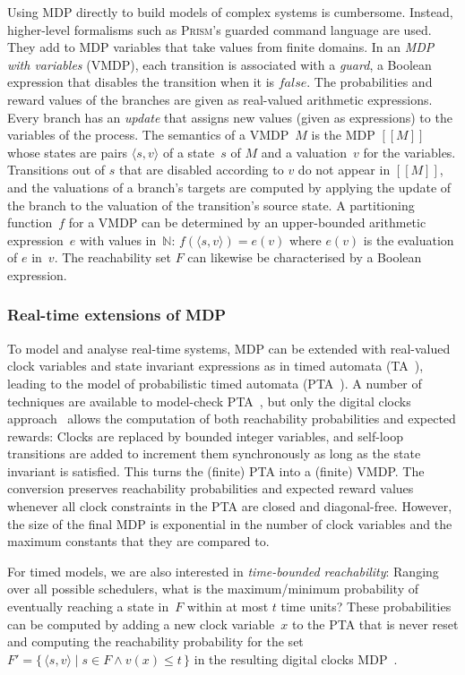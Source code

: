 \documentclass{llncs}
\newcommand{\prism}{\textsc{Prism}\xspace}
\newcommand{\set}[1]{\ensuremath{\{\,#1\,\}}}
\newcommand{\tuple}[1]{\ensuremath{\langle #1 \rangle}}
\newcommand{\NN}{\ensuremath{\mathbb{N}}\xspace}
\newcommand{\False}[0]{\ensuremath{\mathit{false}}\xspace}
\newcommand{\sem}[1]{\ensuremath{[\![ #1 ]\!]}}
\begin{document}
Using MDP directly to build models of complex systems is cumbersome.
Instead, higher-level formalisms such as \prism's guarded command language are used.
They add  to MDP variables that take values from finite domains.
In an \emph{MDP with variables} (VMDP),
each transition is associated with a \emph{guard}, a Boolean expression that disables the transition when it is \False.
The probabilities and reward values of the branches are given as real-valued arithmetic expressions.
Every branch has an \emph{update} that assigns new values (given as expressions) to the variables of the process.
The semantics of a VMDP~$M$ is the MDP $\sem{M}$ whose states are pairs $\tuple{s, v}$ of a state~$s$ of $M$ and a valuation~$v$ for the variables.
Transitions out of $s$ that are disabled according to $v$ do not appear in $\sem{M}$, and the valuations of a branch's targets are computed by applying the update of the branch to the valuation of the transition's source state.
 A partitioning function~$f$ for a VMDP can be determined by an upper-bounded arithmetic expression~$e$ with values in~\NN: $f(\tuple{s, v}) = e(v)$ where $e(v)$ is the evaluation of $e$ in~$v$.
The reachability set $F$ can likewise be characterised by a Boolean expression.

\subsubsection{Real-time extensions of MDP}
To model and analyse real-time systems, MDP can be extended with real-valued clock variables and state invariant expressions as in timed automata (TA~\cite{AD94}), leading to the model of probabilistic timed automata (PTA~\cite{KNSS02}).
A number of techniques are available to model-check PTA~\cite{NPS13}, but only the digital clocks approach~\cite{KNPS06} allows the computation of both reachability probabilities and expected rewards:
Clocks are replaced by bounded integer variables, and self-loop transitions are added to increment them synchronously as long as the state invariant is satisfied.
This turns the (finite) PTA into a (finite) VMDP.
The conversion preserves reachability probabilities and expected reward values whenever all clock constraints in the PTA are closed and diagonal-free.
However, the size of the final MDP is exponential in the number of clock variables and the maximum constants that they are compared to.

For timed models, we are also interested in \emph{time-bounded reachability}:
Ranging over all possible schedulers, what is the maximum/minimum probability of eventually reaching a state in~$F$ within at most $t$ time units?
These probabilities can be computed by adding a new clock variable~$x$ to the PTA that is never reset and computing the reachability probability for the set $F' = \set{\tuple{s, v} \mid s \in F \wedge v(x) \leq t }$ in the resulting digital clocks MDP~\cite{NPS13}.
\end{document}
